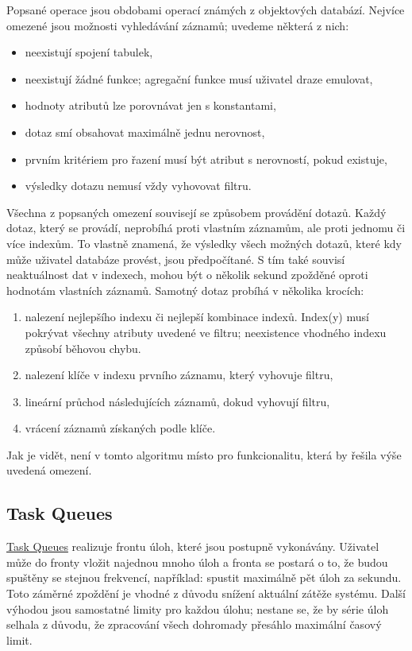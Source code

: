 Popsané operace jsou obdobami operací známých z objektových databází.
Nejvíce omezené jsou možnosti vyhledávání záznamů; uvedeme některá z nich:
\begin{itemize}
	\item neexistují spojení tabulek,
	\item neexistují žádné funkce; agregační funkce musí uživatel draze emulovat,
	\item hodnoty atributů lze porovnávat jen s konstantami,
	\item dotaz smí obsahovat maximálně jednu nerovnost,
	\item prvním kritériem pro řazení musí být atribut s nerovností, pokud existuje,
	\item výsledky dotazu nemusí vždy vyhovovat filtru.
\end{itemize}

Všechna z popsaných omezení souvisejí se způsobem provádění dotazů.
Každý dotaz, který se provádí, neprobíhá proti vlastním záznamům, ale proti jednomu či více indexům.
To vlastně znamená, že výsledky všech možných dotazů, které kdy může uživatel databáze provést, jsou předpočítané.
S tím také souvisí neaktuálnost dat v indexech, mohou být o několik sekund zpožděné oproti hodnotám vlastních záznamů.
Samotný dotaz probíhá v několika krocích:
\begin{enumerate}
	\item nalezení nejlepšího indexu či nejlepší kombinace indexů.
		Index(y) musí pokrývat všechny atributy uvedené ve filtru; neexistence vhodného indexu způsobí běhovou chybu.
	\item nalezení klíče v indexu prvního záznamu, který vyhovuje filtru,
	\item lineární průchod následujících záznamů, dokud vyhovují filtru,
	\item vrácení záznamů získaných podle klíče.
\end{enumerate}

Jak je vidět, není v tomto algoritmu místo pro funkcionalitu, která by řešila výše uvedená omezení.

\subsection{Task Queues}

\href{https://developers.google.com/appengine/docs/java/taskqueue/}{Task Queues} realizuje frontu úloh, které jsou postupně vykonávány.
Uživatel může do fronty vložit najednou mnoho úloh a fronta se postará o to, že budou spuštěny se stejnou frekvencí, například: spustit maximálně pět úloh za sekundu.
Toto záměrné zpoždění je vhodné z důvodu snížení aktuální zátěže systému.
Další výhodou jsou samostatné limity pro každou úlohu; nestane se, že by série úloh selhala z důvodu, že zpracování všech dohromady přesáhlo maximální časový limit.

